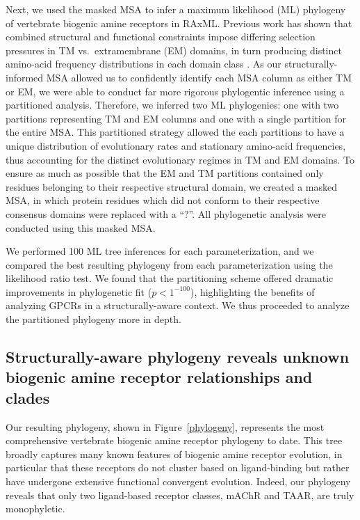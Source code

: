 \documentclass[fleqn,10pt]{wlpeerj}
\begin{document}
Next, we used the masked MSA to infer a maximum likelihood (ML) phylogeny of vertebrate biogenic amine receptors in RAxML. Previous work has shown that combined structural and functional constraints impose differing selection pressures in TM vs.\ extramembrane (EM) domains, in turn producing distinct amino-acid frequency distributions in each domain class \citep{Tourasse2000,Stevens2001,Julenius2006,Oberai2009,SpielmanWilke2013,FranzosaXueXia2013}. As our structurally-informed MSA allowed us to confidently identify each MSA column as either TM or EM, we were able to conduct far more rigorous phylogentic inference using a partitioned analysis. Therefore, we inferred two ML phylogenies: one with two partitions representing TM and EM columns and one with a single partition for the entire MSA. This partitioned strategy allowed the each partitions to have a unique distribution of evolutionary rates and stationary amino-acid frequencies, thus accounting for the distinct evolutionary regimes in TM and EM domains. To ensure as much as possible that the EM and TM partitions contained only residues belonging to their respective structural domain, we created a masked MSA, in which protein residues which did not conform to their respective consensus domains were replaced with a ``?''. All phylogenetic analysis were conducted using this masked MSA.

We performed 100 ML tree inferences for each parameterization, and we compared the best resulting phylogeny from each parameterization using the likelihood ratio test. We found that the partitioning scheme offered dramatic improvements in phylogenetic fit ($p < 1^{-100}$), highlighting the benefits of analyzing GPCRs in a structurally-aware context.  We thus proceeded to analyze the partitioned phylogeny more in depth.


\subsection*{Structurally-aware phylogeny reveals unknown biogenic amine receptor relationships and clades}

Our resulting phylogeny, shown in Figure~\ref{phylogeny}, represents the most comprehensive vertebrate biogenic amine receptor phylogeny to date. This tree broadly captures many known features of biogenic amine receptor evolution, in particular that these receptors do not cluster based on ligand-binding but rather have undergone extensive functional convergent evolution. Indeed, our phylogeny reveals that only two ligand-based receptor classes, mAChR and TAAR, are truly monophyletic. 
\end{document}
